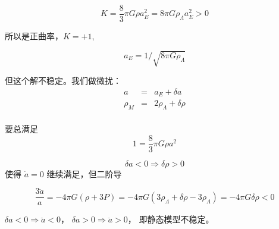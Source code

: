 \documentclass[12pt]{ctexart}
\begin{document}
\begin{equation}
    K=\frac{8}{3} \pi G \rho a_{E}^{2}=8\pi G \rho_\Lambda a_{E}^{2}>0
\end{equation}

所以是正曲率，$K=+1$,

\begin{equation}
    a_E = 1/\sqrt{8\pi G \rho_\Lambda}
\end{equation}

但这个解不稳定。我们做微扰：
\begin{eqnarray}
    a&=&a_{E}+\delta a \\ 
    \rho_{M}&=&2 \rho_\Lambda+\delta \rho \\ 
\end{eqnarray}

要总满足
\begin{equation}
    1=\frac{8}{3} \pi G \rho a^{2}
\end{equation}

\begin{equation}
    \delta a<0 \Rightarrow \delta \rho>0 
\end{equation}
使得 $\dot{a}=0$ 继续满足，但二阶导

\begin{equation}
    \frac{3 \ddot{a}}{a}=-4 \pi G(\rho+3 P)=-4 \pi G\left(3 \rho_\Lambda+\delta \rho-3 \rho_\Lambda\right)=-4 \pi G \delta \rho<0
\end{equation}

$\delta a<0  \Rightarrow \ddot{a}<0$，
$\delta a>0  \Rightarrow \ddot{a}>0$，
即静态模型不稳定。
\end{document}
